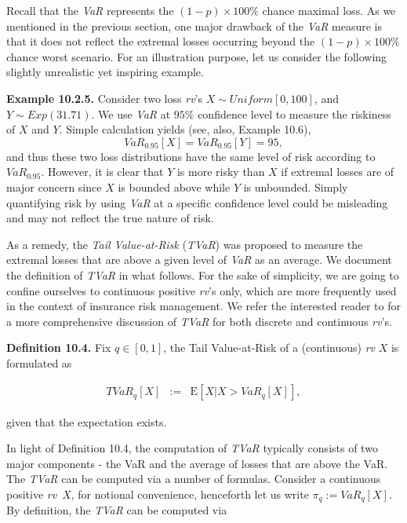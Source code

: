 \documentclass[]{book}
\theoremstyle{definition}
\theoremstyle{definition}
\theoremstyle{definition}
\theoremstyle{remark}
\begin{document}
Recall that the \emph{VaR} represents the \((1-p)\times100\%\) chance
maximal loss. As we mentioned in the previous section, one major
drawback of the \emph{VaR} measure is that it does not reflect the
extremal losses occurring beyond the \((1-p)\times100\%\) chance worst
scenario. For an illustration purpose, let us consider the following
slightly unrealistic yet inspiring example.

\textbf{Example 10.2.5.} Consider two loss \emph{rv}'s
\(X\sim Uniform [0,100]\), and \(Y\sim Exp(31.71)\). We use \emph{VaR}
at \(95\%\) confidence level to measure the riskiness of \(X\) and
\(Y\). Simple calculation yields (see, also, Example 10.6), \[
VaR_{0.95}[X]=VaR_{0.95}[Y]=95,
\] and thus these two loss distributions have the same level of risk
according to \(VaR_{0.95}\). However, it is clear that \(Y\) is more
risky than \(X\) if extremal losses are of major concern since \(X\) is
bounded above while \(Y\) is unbounded. Simply quantifying risk by using
\emph{VaR} at a specific confidence level could be misleading and may
not reflect the true nature of risk.

As a remedy, the \emph{Tail Value-at-Risk} (\emph{TVaR}) was proposed to
measure the extremal losses that are above a given level of \emph{VaR}
as an average. We document the definition of \emph{TVaR} in what
follows. For the sake of simplicity, we are going to confine ourselves
to continuous positive \emph{rv}'s only, which are more frequently used
in the context of insurance risk management. We refer the interested
reader to \citet{hardy2006} for a more comprehensive discussion of
\emph{TVaR} for both discrete and continuous \emph{rv}'s.

\textbf{Definition 10.4.} Fix \(q\in [0,1]\), the Tail Value-at-Risk of
a (continuous) \emph{rv} \(X\) is formulated as

\begin{eqnarray*}
  TVaR_q[X] &:=& \mathrm{E}[X|X>VaR_q[X]],
\end{eqnarray*}

given that the expectation exists.

In light of Definition 10.4, the computation of \emph{TVaR} typically
consists of two major components - the VaR and the average of losses
that are above the VaR. The \emph{TVaR} can be computed via a number of
formulas. Consider a continuous positive \emph{rv}~\(X\), for notional
convenience, henceforth let us write \(\pi_q:=VaR_q[X]\). By definition,
the \emph{TVaR} can be computed via
\end{document}
